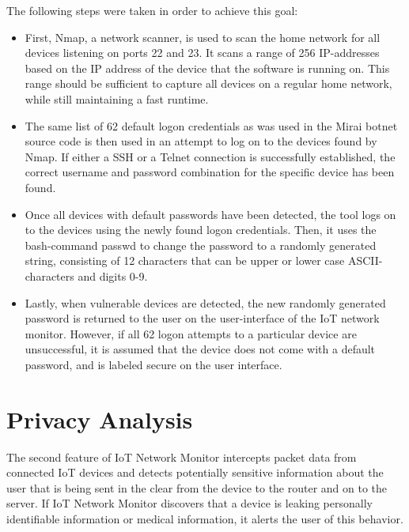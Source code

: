 The following steps were taken in order to achieve this goal:
\begin{itemize}
	\item First, Nmap, a network scanner, is used to scan the home network for all devices listening on ports 22 and 23. It scans a range of 256 IP-addresses based on the IP address of the device that the software is running on. This range should be sufficient to capture all devices on a regular home network, while still maintaining a fast runtime.

	\item The same list of 62 default logon credentials as was used in the Mirai botnet source code is then used in an attempt to log on to the devices found by Nmap. If either a SSH or a Telnet connection is successfully established, the correct username and password combination for the specific device has been found.

	\item Once all devices with default passwords have been detected, the tool logs on to the devices using the newly found logon credentials. Then, it uses the bash-command passwd to change the password to a randomly generated string, consisting of 12 characters that can be upper or lower case ASCII-characters and digits 0-9.

	\item Lastly, when vulnerable devices are detected, the new randomly generated password is returned to the user on the user-interface of the IoT network monitor. However, if all 62 logon attempts to a particular device are unsuccessful, it is assumed that the device does not come with a default password, and is labeled secure on the user interface. 
\end{itemize}

\section{Privacy Analysis}
The second feature of IoT Network Monitor intercepts packet data from connected IoT devices and detects potentially sensitive information about the user that is being sent in the clear from the device to the router and on to the server. If IoT Network Monitor discovers that a device is leaking personally identifiable information or medical information, it alerts the user of this behavior. 

